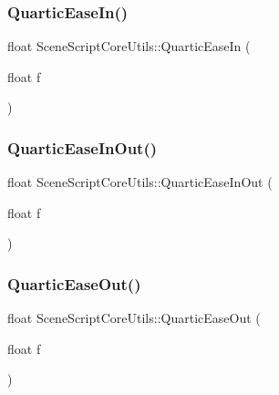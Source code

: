 \hypertarget{class_scene_script_core_utils_acd66bd8fd1a489bc7fe0abaaca747905}{}\label{class_scene_script_core_utils_acd66bd8fd1a489bc7fe0abaaca747905} 
\subsubsection{\texorpdfstring{Quartic\+Ease\+In()}{QuarticEaseIn()}}
{\footnotesize\ttfamily float Scene\+Script\+Core\+Utils\+::\+Quartic\+Ease\+In (\begin{DoxyParamCaption}\item[{float}]{f }\end{DoxyParamCaption})}

\hypertarget{class_scene_script_core_utils_aff8241e270c91be029c84625778930ff}{}\label{class_scene_script_core_utils_aff8241e270c91be029c84625778930ff} 
\subsubsection{\texorpdfstring{Quartic\+Ease\+In\+Out()}{QuarticEaseInOut()}}
{\footnotesize\ttfamily float Scene\+Script\+Core\+Utils\+::\+Quartic\+Ease\+In\+Out (\begin{DoxyParamCaption}\item[{float}]{f }\end{DoxyParamCaption})}

\hypertarget{class_scene_script_core_utils_ac894794c65bc4f0b27858ad332bce270}{}\label{class_scene_script_core_utils_ac894794c65bc4f0b27858ad332bce270} 
\subsubsection{\texorpdfstring{Quartic\+Ease\+Out()}{QuarticEaseOut()}}
{\footnotesize\ttfamily float Scene\+Script\+Core\+Utils\+::\+Quartic\+Ease\+Out (\begin{DoxyParamCaption}\item[{float}]{f }\end{DoxyParamCaption})}

